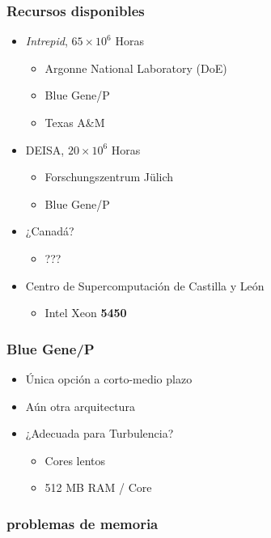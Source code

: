\documentclass{beamer}
\begin{document}
\begin{frame}
\frametitle{Recursos disponibles}
\begin{itemize}
\item \textit{Intrepid}, $65 \times 10^6$ Horas
  \begin{itemize}
  \item Argonne National Laboratory (DoE)
  \item Blue Gene/P
  \item Texas A\&M
  \end{itemize}
\item DEISA, $20 \times 10^6$ Horas
  \begin{itemize}
  \item Forschungszentrum Jülich 
  \item Blue Gene/P
  \end{itemize}
\item ¿Canadá?
  \begin{itemize}
  \item ???
  \end{itemize}
\item Centro de Supercomputación de Castilla y León
  \begin{itemize}
  \item Intel Xeon \textbf{5450}
  \end{itemize}
\end{itemize}
\end{frame}

\begin{frame}
\frametitle{Blue Gene/P}
\begin{Large}
\begin{itemize}
\item Única opción a corto-medio plazo
\item Aún otra arquitectura
\item ¿Adecuada para Turbulencia?
\begin{itemize}
\item{Cores lentos}
\item{512 MB RAM / Core}
\end{itemize}
\end{itemize}
\end{Large}
\end{frame}


\begin{frame}
\frametitle{problemas de memoria}

\end{frame}
\end{document}

